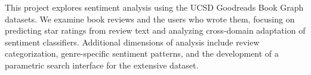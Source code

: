 This project explores sentiment analysis using the UCSD Goodreads Book Graph 
datasets. We examine book reviews and the users who wrote them, focusing on 
predicting star ratings from review text and analyzing cross-domain adaptation of 
sentiment classifiers. Additional dimensions of analysis include review 
categorization, genre-specific sentiment patterns, and the development of a 
parametric search interface for the extensive dataset.